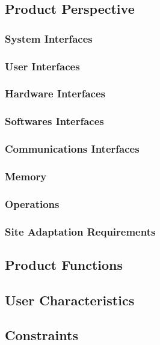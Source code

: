 \documentclass[a4paper,12pt]{article}
\begin{document}
\subsection{Product Perspective}

\subsubsection{System Interfaces}

\subsubsection{User Interfaces}

\subsubsection{Hardware Interfaces}

\subsubsection{Softwares Interfaces}

\subsubsection{Communications Interfaces}

\subsubsection{Memory}

\subsubsection{Operations}

\subsubsection{Site Adaptation Requirements}

\subsection{Product Functions}

\subsection{User Characteristics}

\subsection{Constraints}
\end{document}
